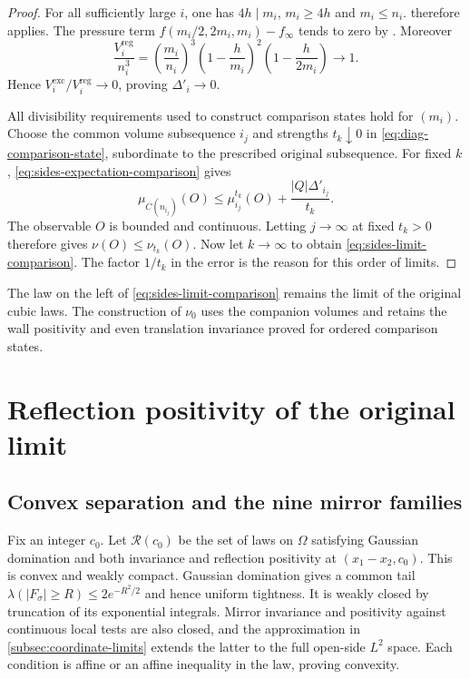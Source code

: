 \begin{proof}
For all sufficiently large $i$, one has $4h\mid m_i$, $m_i\ge4h$
and $m_i\le n_i$.  therefore
applies. The pressure term $f(m_i/2,2m_i,m_i)-f_\infty$ tends
to zero by . Moreover
\begin{equation}\label{eq:sides-volume-ratio}
 \frac{V_i^{\mathrm{reg}}}{n_i^3}
 =\left(\frac{m_i}{n_i}\right)^3
    \left(1-\frac h{m_i}\right)^2
    \left(1-\frac h{2m_i}\right)\longrightarrow1.
\end{equation}
Hence $V_i^{\mathrm{exc}}/V_i^{\mathrm{reg}}\to0$, proving
$\Delta'_i\to0$.

All divisibility requirements used to construct comparison states
hold for $(m_i)$. Choose the common volume subsequence $i_j$ and
strengths $t_k\downarrow0$ in \eqref{eq:diag-comparison-state},
subordinate to the prescribed original subsequence. For fixed $k$,
\eqref{eq:sides-expectation-comparison} gives
\[
 \mu_{C(n_{i_j})}(O)\le\mu_{i_j}^{t_k}(O)
                         +\frac{|Q|\Delta'_{i_j}}{t_k}.
\]
The observable $O$ is bounded and continuous. Letting $j\to\infty$
at fixed $t_k>0$ therefore gives $\nu(O)\le\nu_{t_k}(O)$.
Now let $k\to\infty$ to obtain \eqref{eq:sides-limit-comparison}.
The factor $1/t_k$ in the error is the reason for this order of limits.
\end{proof}

The law on the left of \eqref{eq:sides-limit-comparison} remains the
limit of the original cubic laws. The construction of $\nu_0$ uses
the companion volumes and retains the wall positivity and even
translation invariance proved for ordered comparison states.
\section{Reflection positivity of the original limit}\label{sec:completion}

\subsection{Convex separation and the nine mirror families}\label{subsec:diag-separation}

Fix an integer $c_0$. Let $\mathcal R(c_0)$ be the set of
laws on $\Omega$ satisfying Gaussian domination and both
invariance and reflection positivity at
$(x_1-x_2,c_0)$. This is convex and weakly compact. Gaussian
domination gives a common tail
$\lambda(|F_\sigma|\ge R)\le2e^{-R^2/2}$ and hence uniform
tightness. It is weakly closed by truncation of its exponential
integrals. Mirror invariance and positivity against continuous
local tests are also closed, and the approximation in \cref{subsec:coordinate-limits}
extends the latter to the full open-side $L^2$ space. Each condition is affine
or an affine inequality in the law, proving convexity.

